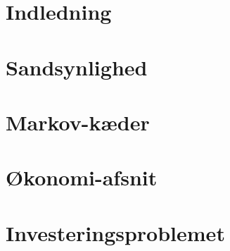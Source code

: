 

 




\chapter{Indledning} 
    

\chapter{Sandsynlighed}\label{kapitel:sandsynlighed}


%

\chapter{Markov-kæder}\label{Kap:MArkov-kæder}

\chapter{Økonomi-afsnit}

\chapter{Investeringsproblemet}








